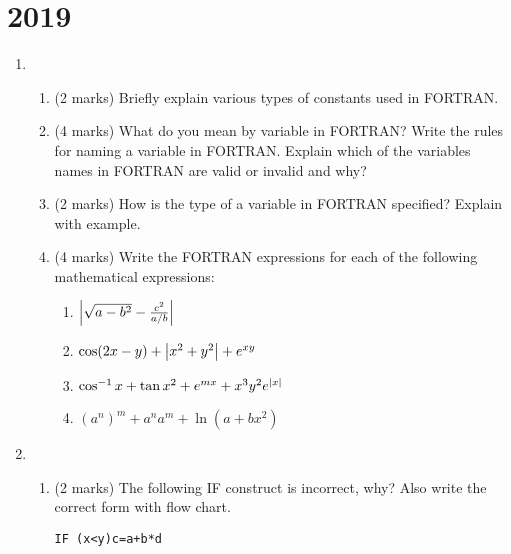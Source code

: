\documentclass[class=book,crop=false]{standalone}
\begin{document}
    \section{2019}
    \begin{enumerate}
        \item \begin{enumerate}
            \item (2 marks) Briefly explain various types of constants used in FORTRAN.
            \item (4 marks) What do you mean by variable in FORTRAN? Write the rules for naming a variable in FORTRAN. Explain which of the variables names in FORTRAN are valid or invalid and why?\\
            \item (2 marks) How is the type of a variable in FORTRAN specified? Explain with example.
            \item (4 marks) Write the FORTRAN expressions for each of the following mathematical expressions:\\
            \begin{enumerate}
                \item $ \left\vert\sqrt{a-b^2}-\frac{c^2}{a/b}\right\vert $
                \item $ \cos(2x-y)+\left\vert x^2+y^2\right\vert+e^{xy} $
                \item $ \cos^{-1} x+\tan x^2+e^{mx}+x^3y^2e^{\left\vert x\right\vert}  $
                \item $ (a^n)^m+a^na^m+\ln(a+bx^2) $
            \end{enumerate}
        \end{enumerate}
        \item \begin{enumerate}
            \item (2 marks) The following IF construct is incorrect, why? Also write the correct form with flow chart.
            \begin{lstlisting}[numbers=none]
                IF (x<y)c=a+b*d

\end{lstlisting}
\end{enumerate}
\end{enumerate}
\end{document}
